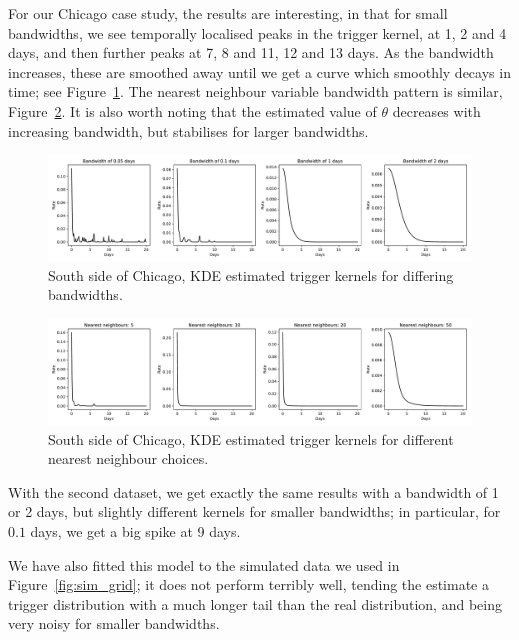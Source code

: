 \documentclass[twoside,a4paper]{article}
\theoremstyle{plain}
\theoremstyle{definition}
\begin{document}
For our Chicago case study, the results are interesting, in that for small
bandwidths, we see temporally localised peaks in the trigger kernel, at 1, 2 and 4 days,
and then further peaks at 7, 8 and 11, 12 and 13 days.  As the bandwidth increases, these
are smoothed away until we get a curve which smoothly decays in time; see
Figure~\ref{fig:grid_kde_trigger}.  The nearest neighbour variable bandwidth pattern is
similar, Figure~\ref{fig:grid_kdenn_trigger}.  It is also worth noting that the estimated
value of $\theta$ decreases with increasing bandwidth, but stabilises for larger bandwidths.

\begin{figure}
  \includegraphics[width=\textwidth]{../notebooks/grid_kde_by_bandwidth.pdf}
  \caption{South side of Chicago, KDE estimated trigger kernels for differing bandwidths.}
  \label{fig:grid_kde_trigger}
\end{figure}

\begin{figure}
  \includegraphics[width=\textwidth]{../notebooks/grid_kde_by_nn.pdf}
  \caption{South side of Chicago, KDE estimated trigger kernels for different nearest neighbour
  choices.}
  \label{fig:grid_kdenn_trigger}
\end{figure}

With the second dataset, we get exactly the same results with a bandwidth of 1 or 2 days,
but slightly different kernels for smaller bandwidths; in particular, for $0.1$ days, we get
a big spike at 9 days.

We have also fitted this model to the simulated data we used in Figure~\ref{fig:sim_grid};
it does not perform terribly well, tending the estimate a trigger distribution with a much
longer tail than the real distribution, and being very noisy for smaller bandwidths.
\end{document}
